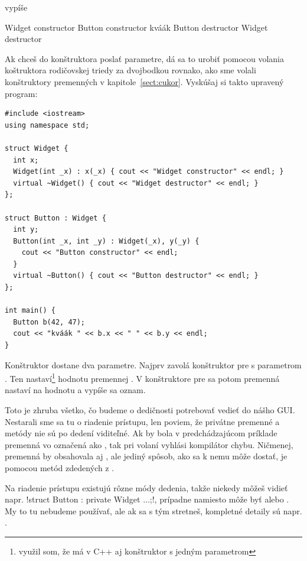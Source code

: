 vypíše 

\begin{outputBox}
Widget constructor
Button constructor
kváák
Button destructor
Widget destructor
\end{outputBox}

Ak chceš do konštruktora poslať parametre, dá sa to urobiť pomocou volania koštruktora rodičovskej
triedy za dvojbodkou
rovnako, ako sme volali konštruktory premenných v kapitole~\ref{sect:cukor}.
Vyskúšaj si takto upravený program:

\begin{lstlisting}
#include <iostream>
using namespace std;

struct Widget {
  int x;
  Widget(int _x) : x(_x) { cout << "Widget constructor" << endl; }
  virtual ~Widget() { cout << "Widget destructor" << endl; }
};

struct Button : Widget {
  int y;
  Button(int _x, int _y) : Widget(_x), y(_y) {
    cout << "Button constructor" << endl;
  }
  virtual ~Button() { cout << "Button destructor" << endl; }
};

int main() {
  Button b(42, 47);
  cout << "kváák " << b.x << " " << b.y << endl;
}
\end{lstlisting}

Konštruktor  dostane dva parametre. 
Najprv zavolá konštruktor pre  s parametrom . Ten nastaví\footnote{%
  využil som, že  má v C++ aj konštruktor s jedným parametrom
} hodnotu premennej 
. V konštruktore pre  sa potom
premenná  nastaví na hodnotu  a vypíše sa oznam.

Toto je zhruba všetko, čo budeme o dedičnosti potrebovať vedieť do nášho GUI. Nestarali sme sa
tu o riadenie prístupu, len poviem, že privátne premenné a metódy nie sú po dedení viditeľné. Ak by bola
v predchádzajúcom príklade premenná  vo  označená ako , tak 
pri volaní  vyhlási kompilátor chybu. Ničmenej, premenná  by obsahovala aj ,
ale jediný spôsob, ako sa k nemu  môže dostať, je pomocou metód zdedených z .

Na riadenie prístupu existujú rôzne módy dedenia, takže niekedy môžeš vidieť napr.
\prg!struct Button : private Widget {...};!, prípadne namiesto  môže byť
 alebo \hbox{.} My to tu nebudeme používať, ale ak sa s tým stretneš, 
kompletné detaily sú napr. .


